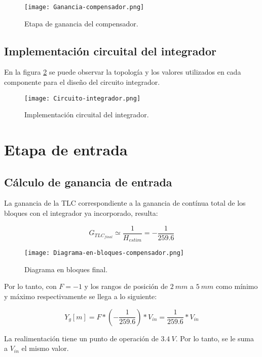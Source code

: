 \begin{figure}[H]
	\centering
	\texttt{[image: Ganancia-compensador.png]}
	\caption{Etapa de ganancia del compensador.}
	\label{fig:ganancia-compensador}
\end{figure}

\subsection{Implementación circuital del integrador}

\noindent En la figura \ref{fig:circuito-integrador} se puede observar la topología y los valores utilizados en cada componente para el diseño del circuito integrador. 

\begin{figure}[H]
	\centering
	\texttt{[image: Circuito-integrador.png]}
	\caption{Implementación circuital del integrador.}
	\label{fig:circuito-integrador}
	\end{figure}
\section{Etapa de entrada}
\subsection{Cálculo de ganancia de entrada}

\noindent La ganancia de la TLC correspondiente a la ganancia de contínua total de los bloques con el integrador ya incorporado, resulta:

\begin{equation} 
	G_{TLC_{final}} \simeq \frac{1}{H_{estim}} = - \frac{1}{259.6}
\end{equation}

\begin{figure}[H]
	\centering
	\texttt{[image: Diagrama-en-bloques-compensador.png]}
	\caption{Diagrama en bloques final.}
	\label{fig:diag-bloques-compensador}
\end{figure}

\noindent Por lo tanto, con $F=-1$ y los rangos de posición de $2\:mm$ a $5\:mm$ como mínimo y máximo respectivamente se llega a lo siguiente:

\begin{equation} 
	Y_g[m] = F * (-\frac{1}{259.6})*V_{in} =\frac{1}{259.6}*V_{in} 
\end{equation}

\noindent La realimentación tiene un punto de operación de $3.4\:V$. Por lo tanto, se le suma a $V_{in}$ el mismo valor.

